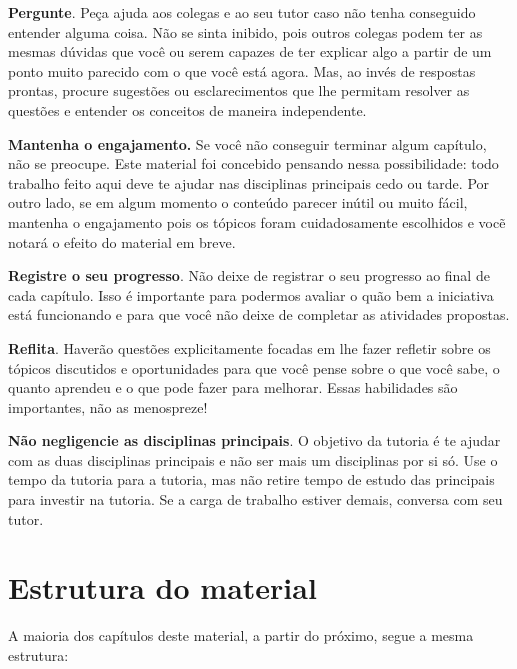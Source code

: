 \documentclass[10pt,openany]{book}
\theoremstyle{estiloQuestao}
\theoremstyle{plain}
\begin{document}
\textbf{Pergunte}. Peça ajuda aos colegas e ao seu tutor caso não tenha conseguido entender alguma coisa. Não se sinta inibido, pois outros colegas podem ter as mesmas dúvidas que você ou serem capazes de ter explicar algo a partir de um ponto muito parecido com o que você está agora. Mas, ao invés de respostas prontas, procure sugestões ou esclarecimentos que lhe permitam resolver as questões e entender os conceitos de maneira independente.



\textbf{Mantenha o engajamento.} Se você não conseguir terminar algum capítulo, não se preocupe. Este material foi concebido pensando nessa possibilidade: todo trabalho feito aqui deve te ajudar nas disciplinas principais cedo ou tarde. Por outro lado, se em algum momento o conteúdo parecer inútil ou muito fácil, mantenha o engajamento pois os tópicos foram cuidadosamente escolhidos e vocẽ notará o efeito do material em breve.

\textbf{Registre o seu progresso}. Não deixe de registrar o seu progresso ao final de cada capítulo. Isso é importante para podermos avaliar o quão bem a iniciativa está funcionando e para que você não deixe de completar as atividades propostas.

\textbf{Reflita}. Haverão questões explicitamente focadas em lhe fazer refletir sobre os tópicos discutidos e oportunidades para que você pense sobre o que você sabe, o quanto aprendeu e o que pode fazer para melhorar. Essas habilidades são importantes, não as menospreze! 

\textbf{Não negligencie as disciplinas principais}. O objetivo da tutoria é te ajudar com as duas disciplinas principais e não ser mais um disciplinas por si só. Use o tempo da tutoria para a tutoria, mas não retire tempo de estudo das principais para investir na tutoria. Se a carga de trabalho estiver demais, conversa com seu tutor.

\section{Estrutura do material}

A maioria dos capítulos deste material, a partir do próximo, segue a mesma estrutura:
\end{document}

